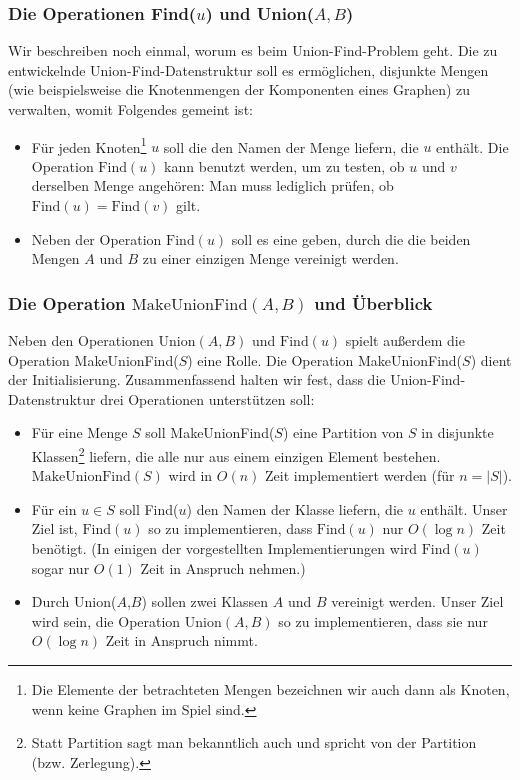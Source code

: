 \documentclass[smaller,xcolor=dvipsnames]{beamer}
\newcommand{\opfind}{\text{Find}}
\newcommand{\opunion}{\text{Union}}
\newcommand{\opmakeunionfind}{\text{MakeUnionFind}}
\begin{document}
\begin{frame}
\frametitle{Die Operationen Find($u$) und Union($A,B$)}
 Wir beschreiben noch einmal, worum es beim Union-Find-Problem geht. \alert{Die zu entwickelnde Union-Find-Datenstruktur soll es ermöglichen, disjunkte Mengen (wie beispielsweise die Knotenmengen der Komponenten eines Graphen) zu verwalten, womit Folgendes gemeint ist}:
\begin{itemize}
\item Für jeden Knoten\footnote{Die Elemente der betrachteten Mengen bezeichnen wir auch dann als Knoten, wenn keine Graphen im Spiel sind.} $u$ soll die  den Namen der Menge liefern, die $u$ enthält. Die Operation $\opfind(u)$ kann benutzt werden, um zu testen, ob $u$ und $v$ derselben Menge angehören: Man muss lediglich prüfen, ob $\opfind{(u)} = \opfind{(v)}$ gilt.

\item Neben der Operation $\opfind{(u)}$ soll es eine  geben, durch die die beiden Mengen $A$ und $B$ zu einer einzigen Menge vereinigt werden.
\end{itemize}
\end{frame}

\begin{frame}
\frametitle{Die Operation $\opmakeunionfind(A,B)$ und Überblick}
 Neben den Operationen $\opunion{(A,B)}$ und $\opfind{(u)}$ spielt außerdem die \alert{Operation MakeUnionFind($S$)} eine Rolle. Die Operation MakeUnionFind($S$) dient der Initialisierung. Zusammenfassend halten wir fest, dass die Union-Find-Datenstruktur drei Operationen unterstützen soll:
\begin{itemize}
\item Für eine Menge $S$ soll \alert{MakeUnionFind($S$)} eine Partition von $S$ in disjunkte Klassen\footnote{Statt Partition sagt man bekanntlich auch  und spricht von  der Partition (bzw. Zerlegung).} liefern, die alle nur aus einem einzigen Element bestehen. $\opmakeunionfind{(S)}$ wird in $O(n)$ Zeit implementiert werden (für $n = |S|$).

\item Für ein $u \in S$ soll \alert{Find($u$)} den Namen der Klasse liefern, die $u$ enthält. Unser Ziel ist, $\opfind{(u)}$ so zu implementieren, dass $\opfind{(u)}$ nur $O(\log{n})$ Zeit benötigt. (In einigen der vorgestellten Implementierungen wird $\opfind{(u)}$ sogar nur $O(1)$ Zeit in Anspruch nehmen.)

\item Durch \alert{Union($A$,$B$)} sollen zwei Klassen $A$ und $B$ vereinigt werden. Unser Ziel wird sein, die Operation $\opunion{(A,B)}$ so zu implementieren, dass sie nur $O(\log{n})$ Zeit in Anspruch nimmt.
\end{itemize}
\end{frame}
\end{document}
